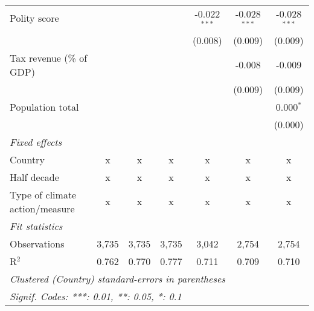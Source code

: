 \begin{tabular}{lcccccc}
   Polity score                                                        &         &               &                & -0.022$^{***}$ & -0.028$^{***}$ & -0.028$^{***}$\\   
                                                                       &         &               &                & (0.008)        & (0.009)        & (0.009)\\   
   Tax revenue (\% of GDP)                                             &         &               &                &                & -0.008         & -0.009\\   
                                                                       &         &               &                &                & (0.009)        & (0.009)\\   
   Population total                                                    &         &               &                &                &                & 0.000$^{*}$\\   
                                                                       &         &               &                &                &                & (0.000)\\   
   \emph{Fixed effects}\\
   Country                                                             & x       & x             & x              & x              & x              & x\\  
   Half decade                                                         & x       & x             & x              & x              & x              & x\\  
   Type of climate action/measure                                      & x       & x             & x              & x              & x              & x\\  
   \midrule \emph{Fit statistics}\\
   Observations                                                        & 3,735   & 3,735         & 3,735          & 3,042          & 2,754          & 2,754\\  
   R$^2$                                                               & 0.762   & 0.770         & 0.777          & 0.711          & 0.709          & 0.710\\  
   \midrule
   \multicolumn{7}{l}{\emph{Clustered (Country) standard-errors in parentheses}}\\
   \multicolumn{7}{l}{\emph{Signif. Codes: ***: 0.01, **: 0.05, *: 0.1}}\\
\end{tabular}
\par\endgroup


